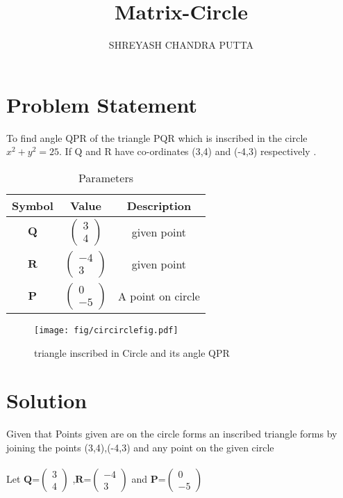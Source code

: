 \documentclass[journal,12pt,twocolumn]{article}
\title{
Matrix-Circle
}
\author{SHREYASH CHANDRA PUTTA}
\newcommand{\myvec}[1]{\ensuremath{\begin{pmatrix}#1\end{pmatrix}}}
\let\vec\mathbf
\begin{document}
\maketitle
\tableofcontents
\bigskip
\section{Problem Statement}
To find angle QPR of the triangle PQR which is inscribed in the circle $x^2 + y^2 = 25$. If Q and R  have  co-ordinates (3,4) and (-4,3) respectively .

\begin{table}[h]
    \centering
    \begin{tabular}{|c|c|c|}
       \hline
       \textbf{Symbol}&\textbf{Value}&\textbf{Description}  \\
       \hline
	    $\vec{Q}$ & $\myvec{
		    3\\
		    4}$
	    & given point\\
        \hline
	    $\vec{R}$ & $\myvec{-4\\3}$
 & given point\\
        \hline
	    $\vec{P}$ & $\myvec{0\\-5}$
 & A point on circle  \\
       \hline
    \end{tabular}
    \caption{Parameters}
    \label{tab:my_label}
\end{table}

\begin{figure}[h]
    \centering
\texttt{[image: fig/circirclefig.pdf]}
    \caption{triangle inscribed in Circle and its angle QPR }
    \label{fig:my_label}
\end{figure}
\vspace{2cm}
\section{Solution}
Given that Points given are on the circle forms an inscribed triangle forms by joining the points (3,4),(-4,3) and any point on the given circle   \\
\\
Let ${\vec{Q}}$=$\myvec{
  3\\
  4}$
  ,${\vec{R}}$=$\myvec{
  -4\\
  3}$
 and ${\vec{P}}$=$\myvec{
  0\\
  -5}$
\\
\\
\end{document}

